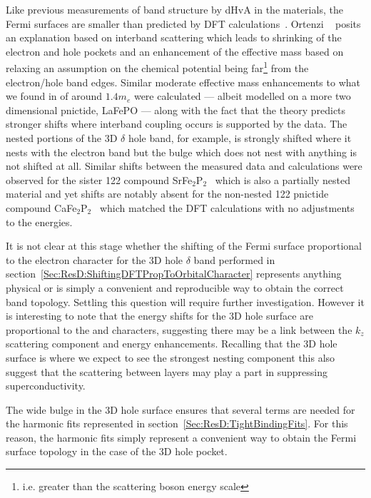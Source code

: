 Like previous measurements of band structure by \ac{dHvA} in the \BaFeAsP{} materials, the Fermi surfaces are smaller than predicted by \ac{DFT} calculations~\cite{Shishido2010, Analytis2010c}. Ortenzi \etal~\cite{Ortenzi2009} posits an explanation based on interband scattering which leads to shrinking of the electron and hole pockets and an enhancement of the effective mass based on relaxing an assumption on the chemical potential being far\footnote{i.e. greater than the scattering boson energy scale} from the electron/hole band edges. Similar moderate effective mass enhancements to what we found in \BaFeP{} of around $1.4m_e$ were calculated --- albeit modelled on a more two dimensional pnictide, LaFePO --- along with the fact that the theory predicts stronger shifts where interband coupling occurs is supported by the \BaFeP{} data. The nested portions of the 3D $\delta$ hole band, for example, is strongly shifted where it nests with the electron band but the bulge which does not nest with anything is not shifted at all. Similar shifts between the measured data and calculations were observed for the sister 122 compound SrFe$_2$P$_2$~\cite{Analytis2009} which is also a partially nested material and yet shifts are notably absent for the non-nested 122 pnictide compound CaFe$_2$P$_2$~\cite{Coldea2009} which matched the \ac{DFT} calculations with no adjustments to the energies. 


It is not clear at this stage whether the shifting of the Fermi surface proportional to the electron character for the 3D hole $\delta$ band performed in section~\ref{Sec:ResD:ShiftingDFTPropToOrbitalCharacter} represents anything physical or is simply a convenient and reproducible way to obtain the correct band topology. Settling this question will require further investigation. However it is interesting to note that the energy shifts for the 3D hole surface are proportional to the \DzTwo{} and \DxzDyz{} characters, suggesting there may be a link between the $k_z$ scattering component and energy enhancements. Recalling that the 3D hole surface is where we expect to see the strongest nesting component this also suggest that the scattering between layers may play a part in suppressing superconductivity.

The wide bulge in the 3D hole surface ensures that several terms are needed for the harmonic fits represented in section~\ref{Sec:ResD:TightBindingFits}. For this reason, the harmonic fits simply represent a convenient way to obtain the Fermi surface topology in the case of the 3D hole pocket.
